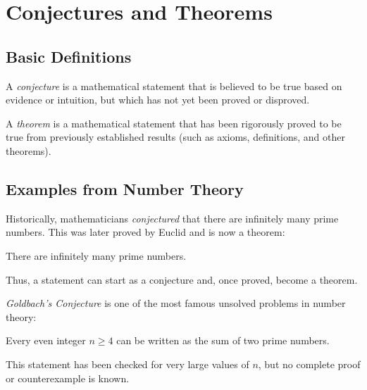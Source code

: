 \section{Conjectures and Theorems}

\subsection{Basic Definitions}

\begin{definition}
A \emph{conjecture} is a mathematical statement that is believed to be true
based on evidence or intuition, but which has not yet been proved or disproved.
\end{definition}

\begin{definition}
A \emph{theorem} is a mathematical statement that has been rigorously proved
to be true from previously established results (such as axioms, definitions,
and other theorems).
\end{definition}

\subsection{Examples from Number Theory}

\begin{example}
Historically, mathematicians \emph{conjectured} that there are infinitely many prime numbers.
This was later proved by Euclid and is now a theorem:

\begin{theorem}[Euclid]
There are infinitely many prime numbers.
\end{theorem}

Thus, a statement can start as a conjecture and, once proved, become a theorem.
\end{example}

\begin{example}
\emph{Goldbach's Conjecture} is one of the most famous unsolved problems in number theory:

\begin{conjecture}[Goldbach]
Every even integer \( n \geq 4 \) can be written as the sum of two prime numbers.
\end{conjecture}

This statement has been checked for very large values of \( n \), but no complete proof
or counterexample is known.
\end{example}

